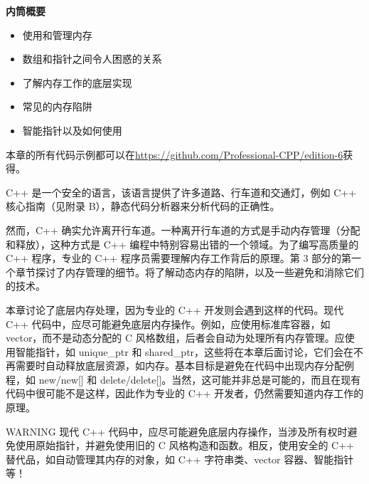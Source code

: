 \noindent
\textbf{内筒概要}

\begin{itemize}
\item
使用和管理内存

\item
数组和指针之间令人困惑的关系

\item
了解内存工作的底层实现

\item
常见的内存陷阱

\item
智能指针以及如何使用
\end{itemize}

本章的所有代码示例都可以在\url{https://github.com/Professional-CPP/edition-6}获得。

C++ 是一个安全的语言，该语言提供了许多道路、行车道和交通灯，例如 C++ 核心指南（见附录 B），静态代码分析器来分析代码的正确性。

然而，C++ 确实允许离开行车道。一种离开行车道的方式是手动内存管理（分配和释放），这种方式是 C++ 编程中特别容易出错的一个领域。为了编写高质量的 C++ 程序，专业的 C++ 程序员需要理解内存工作背后的原理。第 3 部分的第一个章节探讨了内存管理的细节。将了解动态内存的陷阱，以及一些避免和消除它们的技术。

本章讨论了底层内存处理，因为专业的 C++ 开发则会遇到这样的代码。现代 C++ 代码中，应尽可能避免底层内存操作。例如，应使用标准库容器，如 vector，而不是动态分配的 C 风格数组，后者会自动为处理所有内存管理。应使用智能指针，如 unique\_ptr 和 shared\_ptr，这些将在本章后面讨论，它们会在不再需要时自动释放底层资源，如内存。基本目标是避免在代码中出现内存分配例程，如 new/new[] 和 delete/delete[]。当然，这可能并非总是可能的，而且在现有代码中很可能不是这样，因此作为专业的 C++ 开发者，仍然需要知道内存工作的原理。

\begin{myWarning}{WARNING}
现代 C++ 代码中，应尽可能避免底层内存操作，当涉及所有权时避免使用原始指针，并避免使用旧的 C 风格构造和函数。相反，使用安全的 C++ 替代品，如自动管理其内存的对象，如 C++ 字符串类、vector 容器、智能指针等！
\end{myWarning}





